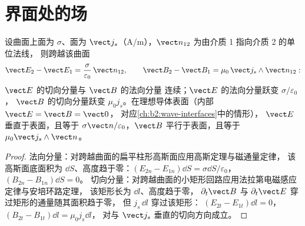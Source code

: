 \section{界面处的场}

\begin{proposition}[边界关系]\label{prop:b2:maxwell-equations:boundary}
设曲面上面为 $\sigma$、面为
$\vect j_s$（\unit{A/m}），$\vect n_{12}$ 为由介质 1 指向介质 2 的单位法线，
则跨越该曲面
\[
\vect E_2 - \vect E_1 = \frac\sigma{\varepsilon_0}\,\vect n_{12} , \qquad
\vect B_2 - \vect B_1 = \mu_0\,\vect j_s\wedge\vect n_{12} :
\]
$\vect E$ 的切向分量与 $\vect B$ 的法向分量
连续；$\vect E$ 的法向分量跃变 $\sigma/\varepsilon_0$，
$\vect B$ 的切向分量跃变 $\mu_0j_s$。在理想导体表面（内部 $\vect E = \vect B = \vect 0$，
对应\cref{ch:b2:wave-interfaces}中的情形），
$\vect E$ 垂直于表面，且等于 $\sigma\vect n/
\varepsilon_0$，$\vect B$ 平行于表面，且等于 $\mu_0\vect j_s\wedge\vect n$。
\end{proposition}

\begin{proof}
法向分量：对跨越曲面的扁平柱形高斯面应用高斯定理与磁通量定律，
该高斯面底面积为 $\dd S$、高度趋于零：$(E_{2n}
- E_{1n})\dd S = \sigma\dd S/\varepsilon_0$，$(B_{2n} - B_{1n})\dd S = 0$。
切向分量：对跨越曲面的小矩形回路应用法拉第电磁感应定律与安培环路定理，
该矩形长为 $\dd l$、高度趋于零，
$\partial_t\vect B$ 与 $\partial_t\vect E$ 穿过矩形的通量随其面积趋于零，
但 $j_s\,\dd l$ 穿过该矩形：
$(E_{2t} - E_{1t})\dd l = 0$，$(B_{2t} - B_{1t})\dd l = \mu_0j_s\dd l$，
对与 $\vect j_s$ 垂直的切向方向成立。
\end{proof}

